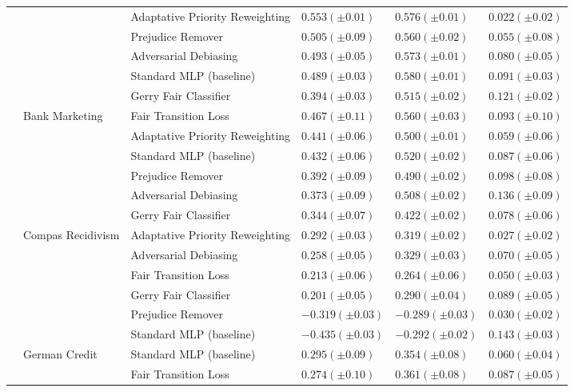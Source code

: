 \begin{tabular}{llllll}
 &  & Adaptative Priority Reweighting & $0.553 (\pm0.01)$ & $0.576 (\pm0.01)$ & $0.022 (\pm0.02)$ \\
 &  & Prejudice Remover & $0.505 (\pm0.09)$ & $0.560 (\pm0.02)$ & $0.055 (\pm0.08)$ \\
 &  & Adversarial Debiasing & $0.493 (\pm0.05)$ & $0.573 (\pm0.01)$ & $0.080 (\pm0.05)$ \\
 &  & Standard MLP (baseline) & $0.489 (\pm0.03)$ & $0.580 (\pm0.01)$ & $0.091 (\pm0.03)$ \\
 &  & Gerry Fair Classifier & $0.394 (\pm0.03)$ & $0.515 (\pm0.02)$ & $0.121 (\pm0.02)$ \\
\cline{2-6}
 & \multirow[t]{6}{*}{Bank Marketing} & Fair Transition Loss & $0.467 (\pm0.11)$ & $0.560 (\pm0.03)$ & $0.093 (\pm0.10)$ \\
 &  & Adaptative Priority Reweighting & $0.441 (\pm0.06)$ & $0.500 (\pm0.01)$ & $0.059 (\pm0.06)$ \\
 &  & Standard MLP (baseline) & $0.432 (\pm0.06)$ & $0.520 (\pm0.02)$ & $0.087 (\pm0.06)$ \\
 &  & Prejudice Remover & $0.392 (\pm0.09)$ & $0.490 (\pm0.02)$ & $0.098 (\pm0.08)$ \\
 &  & Adversarial Debiasing & $0.373 (\pm0.09)$ & $0.508 (\pm0.02)$ & $0.136 (\pm0.09)$ \\
 &  & Gerry Fair Classifier & $0.344 (\pm0.07)$ & $0.422 (\pm0.02)$ & $0.078 (\pm0.06)$ \\
\cline{2-6}
 & \multirow[t]{6}{*}{Compas Recidivism} & Adaptative Priority Reweighting & $0.292 (\pm0.03)$ & $0.319 (\pm0.02)$ & $0.027 (\pm0.02)$ \\
 &  & Adversarial Debiasing & $0.258 (\pm0.05)$ & $0.329 (\pm0.03)$ & $0.070 (\pm0.05)$ \\
 &  & Fair Transition Loss & $0.213 (\pm0.06)$ & $0.264 (\pm0.06)$ & $0.050 (\pm0.03)$ \\
 &  & Gerry Fair Classifier & $0.201 (\pm0.05)$ & $0.290 (\pm0.04)$ & $0.089 (\pm0.05)$ \\
 &  & Prejudice Remover & $-0.319 (\pm0.03)$ & $-0.289 (\pm0.03)$ & $0.030 (\pm0.02)$ \\
 &  & Standard MLP (baseline) & $-0.435 (\pm0.03)$ & $-0.292 (\pm0.02)$ & $0.143 (\pm0.03)$ \\
\cline{2-6}
 & \multirow[t]{6}{*}{German Credit} & Standard MLP (baseline) & $0.295 (\pm0.09)$ & $0.354 (\pm0.08)$ & $0.060 (\pm0.04)$ \\
 &  & Fair Transition Loss & $0.274 (\pm0.10)$ & $0.361 (\pm0.08)$ & $0.087 (\pm0.05)$ \\

\end{tabular}

